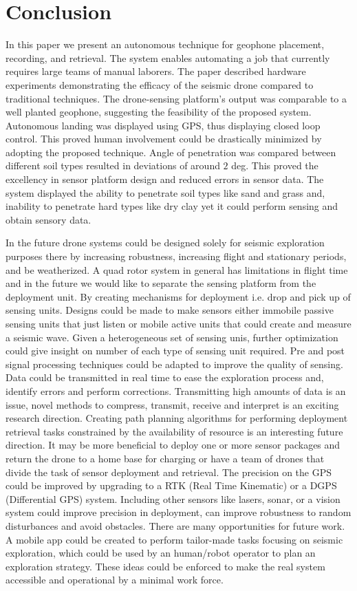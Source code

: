  \section{Conclusion}\label{sec:Conclusion}
In this paper we present an autonomous technique for geophone placement, recording, and retrieval. The system enables automating a job that currently requires large teams of manual laborers.
 The paper described hardware experiments demonstrating the efficacy of the seismic drone compared to traditional techniques. The drone-sensing platform's output was comparable to a well planted geophone, suggesting the feasibility of the proposed system. Autonomous landing was displayed using GPS, thus displaying closed loop control. This proved human involvement could be drastically minimized by adopting the proposed technique. Angle of penetration was compared between different soil types resulted in deviations of around $2$ deg. This proved the excellency in sensor platform design and reduced errors in sensor data. The system displayed the ability to penetrate soil types like sand and grass and, inability to penetrate hard types like dry clay yet it could perform sensing and obtain sensory data.
 
 In the future drone systems could be designed solely for seismic exploration purposes there by increasing robustness, increasing flight and stationary periods, and be weatherized.  
A quad rotor system in general has limitations in flight time and in the future we would like to separate the sensing platform from the deployment unit. By creating mechanisms for deployment i.e. drop and pick up of sensing units. Designs could be made to make sensors either immobile passive sensing units that just listen or mobile active units that could create and measure a seismic wave. Given a heterogeneous set of sensing unis, further optimization could give insight on number of each type of sensing unit required.  Pre and post signal processing techniques could be adapted to improve the quality of sensing. Data could be transmitted in real time to ease the exploration process and, identify errors and perform corrections. Transmitting high amounts of data is an issue, novel methods to compress, transmit, receive and interpret is an exciting research direction. Creating path planning algorithms for performing deployment retrieval tasks constrained by the availability of resource is an interesting future direction. It may be more beneficial to deploy one or more sensor packages and return the drone to a home base for charging or have a team of drones that divide the task of sensor deployment and retrieval. The precision on the GPS could be improved by upgrading to a RTK (Real Time Kinematic) or a DGPS (Differential GPS) system. Including other sensors like lasers, sonar, or a vision system could improve precision in deployment, can improve robustness to random disturbances and avoid obstacles. There are many opportunities for future work. A mobile app could be created to perform tailor-made tasks focusing on seismic exploration, which could be used by an human/robot operator to plan an exploration strategy. These ideas could be enforced to make the real system accessible and operational by a minimal work force.

